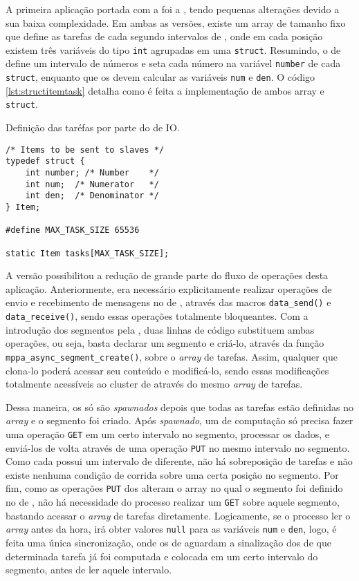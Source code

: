 A primeira aplicação portada com a \ASYNC foi a \FN, tendo pequenas alterações devido a sua baixa complexidade. Em ambas as versões, existe um array de tamanho fixo que define as tarefas de cada \cluster segundo intervalos de \offsets, onde em cada posição existem três variáveis do tipo \texttt{int} agrupadas em uma \texttt{struct}. Resumindo, o \cluster de \IO define um intervalo de números e seta cada número na variável \texttt{number} de cada \texttt{struct}, enquanto que os \CCs devem calcular as variáveis \texttt{num} e \texttt{den}. O código \ref{lst:structitemtask} detalha como é feita a implementação de ambos array e \texttt{struct}.

\begin{listing}[h]
\caption{Definição das taréfas por  parte do \cluster de IO.}
\label{lst:structitemtask}
\begin{verbatim}
/* Items to be sent to slaves */
typedef struct {
    int number; /* Number    */
    int num;  /* Numerator   */
    int den;  /* Denominator */
} Item;    

#define MAX_TASK_SIZE 65536

static Item tasks[MAX_TASK_SIZE];
\end{verbatim}
\end{listing}

A versão \ASYNC possibilitou a redução de grande parte do fluxo de operações desta aplicação. Anteriormente, era necessário explicitamente realizar operações de envio e recebimento de mensagens no \cluster de \IO, através das macros \texttt{data\_send()} e \texttt{data\_receive()}, sendo essas operações totalmente bloqueantes. Com a introdução dos segmentos pela \API \ASYNC, duas linhas de código substituem ambas operações, ou seja, basta declarar um segmento e criá-lo, através da função \texttt{mppa\_async\_segment\_create()}, sobre o \textit{array} de tarefas. Assim, qualquer \CC que clona-lo poderá acessar seu conteúdo e modificá-lo, sendo essas modificações totalmente acessíveis ao cluster de \IO através do mesmo \textit{array} de tarefas.

Dessa maneira, os \CCs só são \textit{spawnados} depois que todas as tarefas estão definidas no \textit{array} e o segmento foi criado. Após \textit{spawnado}, um \cluster de computação só precisa fazer uma operação \texttt{GET} em um certo intervalo no segmento, processar os dados, e enviá-los de volta através de uma operação \texttt{PUT} no mesmo intervalo no segmento. Como cada \CC possui um intervalo de \offsets diferente, não há sobreposição de tarefas e não existe nenhuma condição de corrida sobre uma certa posição no segmento. Por fim, como as operações \texttt{PUT} dos \CCs alteram o array no qual o segmento foi definido no \cluster de \IO, não há necessidade do processo \master realizar um \texttt{GET} sobre aquele segmento, bastando acessar o \textit{array} de tarefas diretamente. Logicamente, se o processo \master ler o \textit{array} antes da hora, irá obter valores \texttt{null} para as variáveis \texttt{num} e \texttt{den}, logo, é feita uma única sincronização, onde os \clusters de \IO aguardam a sinalização dos \CCs de que determinada tarefa já foi computada e colocada em um certo intervalo do segmento, antes de ler aquele intervalo.

